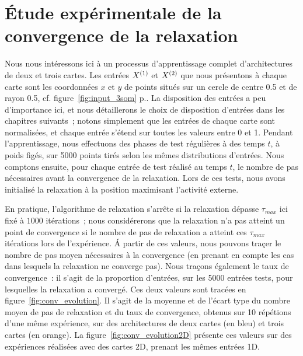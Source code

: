 \documentclass[../main]{subfiles}
\begin{document}
\section{\'Etude expérimentale de la convergence de la relaxation}

Nous nous intéressons ici à un processus d'apprentissage complet d'architectures de deux et trois cartes. 
Les entrées $X^{({1})}$ et $X^{({2})}$ que nous présentons à chaque carte sont les coordonnées $x$ et $y$ de points situés sur un cercle de centre 0.5 et de rayon 0.5, cf. figure~\ref{fig:input_3som} p.\pageref{fig:input_3som}. La disposition des entrées a peu d'importance ici, et nous détaillerons le choix de disposition d'entrées dans les chapitres suivants~; notons simplement que les entrées de chaque carte sont normalisées, et chaque entrée s'étend sur toutes les valeurs entre 0 et 1.
Pendant l'apprentissage, nous effectuons des phases de test régulières à des temps $t$, à poids figés, sur 5000 points tirés selon les mêmes distributions d'entrées. 
Nous comptons ensuite, pour chaque entrée de test réalisé au temps $t$, le nombre de pas nécessaires avant la convergence de la relaxation. Lors de ces tests, nous avons initialisé la relaxation à la position maximisant l'activité externe.

En pratique, l'algorithme de relaxation s'arrête si la relaxation dépasse $\tau_{max}$ ici fixé à $1000$ itérations~; nous considérerons que la relaxation n'a pas atteint un point de convergence si le nombre de pas de relaxation a atteint ces $\tau_{max}$ itérations lors de l'expérience.
\'A partir de ces valeurs, nous pouvons traçer le nombre de pas moyen nécessaires à la convergence (en prenant en compte les cas dans lesquels la relaxation ne converge pas).
Nous traçons également le taux de convergence~: il s'agit de la proportion d'entrées, sur les 5000 entrées tests, pour lesquelles la relaxation a convergé.
Ces deux valeurs sont tracées en figure~\ref{fig:conv_evolution}. Il s'agit de la moyenne et de l'écart type du nombre moyen de pas de relaxation et du taux de convergence, obtenus sur 10 répétions d'une même expérience, sur des architectures de deux cartes (en bleu) et trois cartes (en orange).
La figure~\ref{fig:conv_evolution2D} présente ces valeurs sur des expériences réalisées avec des cartes 2D, prenant les mêmes entrées 1D.
\end{document}
